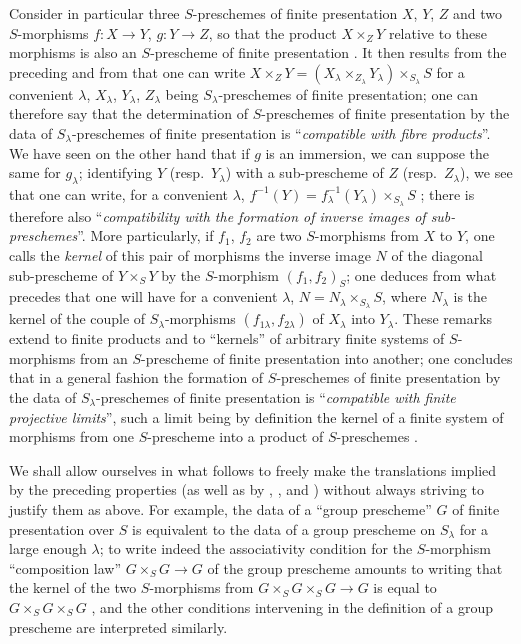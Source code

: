 \begin{env}[8.8.3]
Consider in particular three $S$-preschemes of finite presentation $X$, $Y$, $Z$ and two $S$-morphisms $f:X\to Y$, $g:Y\to Z$, so that the product $X\times_Z Y$ relative to these morphisms is also an $S$-prescheme of finite presentation .
It then results from the preceding and from  that one can write $X\times_Z Y=(X_\lambda\times_{Z_\lambda}Y_\lambda)\times_{S_\lambda}S$ for a convenient $\lambda$, $X_\lambda$, $Y_\lambda$, $Z_\lambda$ being $S_\lambda$-preschemes of finite presentation; one can therefore say that the determination of $S$-preschemes of finite presentation by the data of $S_\lambda$-preschemes of finite presentation is ``\emph{compatible with fibre products}''.
We have seen on the other hand  that if $g$ is an immersion, we can suppose the same for $g_\lambda$; identifying $Y$ (resp.\ $Y_\lambda$) with a sub-prescheme of $Z$ (resp.\ $Z_\lambda$), we see that one can write, for a convenient $\lambda$, $f^{-1}(Y)=f_\lambda^{-1}(Y_\lambda)\times_{S_\lambda}S$ ;
there is therefore also ``\emph{compatibility with the formation of inverse images of sub-preschemes}''.
More particularly, if $f_1$, $f_2$ are two $S$-morphisms from $X$ to $Y$, one calls the \emph{kernel} of this pair of morphisms the inverse image $N$ of the diagonal sub-prescheme of $Y\times_S Y$ by the $S$-morphism $(f_1,f_2)_S$; one deduces from what precedes that one will have for a convenient $\lambda$, $N=N_\lambda\times_{S_\lambda}S$, where $N_\lambda$ is the kernel of the couple of $S_\lambda$-morphisms $(f_{1\lambda},f_{2\lambda})$ of $X_\lambda$ into $Y_\lambda$.
These remarks extend to finite products and to ``kernels'' of arbitrary finite systems of $S$-morphisms from an $S$-prescheme of finite presentation into
another; one concludes that in a general fashion the formation of $S$-preschemes of finite presentation by the data of $S_\lambda$-preschemes of finite presentation is ``\emph{compatible with finite projective limits}'', such a limit being by definition the kernel of a finite system of morphisms from one $S$-prescheme into a product of $S$-preschemes .

We shall allow ourselves in what follows to freely make the translations implied by the preceding properties (as well as by , , and ) without always striving to justify them as above.
For example, the data of a ``group prescheme'' $G$ of finite presentation over $S$ is equivalent to the data of a group prescheme on $S_\lambda$ for a large enough $\lambda$; to write indeed the associativity condition for the $S$-morphism ``composition law'' $G\times_S G\to G$ of the group prescheme amounts to writing that the kernel of the two $S$-morphisms from $G\times_S G\times_S G\to G$ is equal to $G\times_S G\times_S G$ , and the other conditions intervening in the definition of a group prescheme are interpreted similarly.
\end{env}

